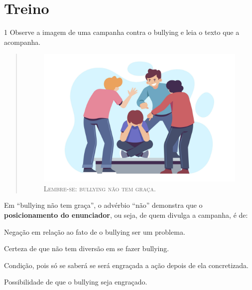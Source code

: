 \section*{Treino}

\num{1} Observe a imagem de uma campanha contra o bullying e leia o
texto que a acompanha.

\begin{quote}
\begin{figure}[H]
\centering\includegraphics[width=\textwidth]{./imgSAEB_6_POR/freepik/PORT_6_IMG-27.jpeg}
\caption{\textsc{Lembre-se: bullying não tem graça.}}
\end{figure}
\end{quote}

\noindent Em ``bullying não tem graça'', o advérbio ``não'' demonstra que o
\textbf{posicionamento do enunciador}, ou seja, de quem divulga a
campanha, é de:

\begin{escolha}
\item Negação em relação ao fato de o bullying ser um problema.
\item Certeza de que não tem diversão em se fazer bullying.
\item Condição, pois só se saberá se será engraçada a ação depois de ela
concretizada.
\item Possibilidade de que o bullying seja engraçado.
\end{escolha}


